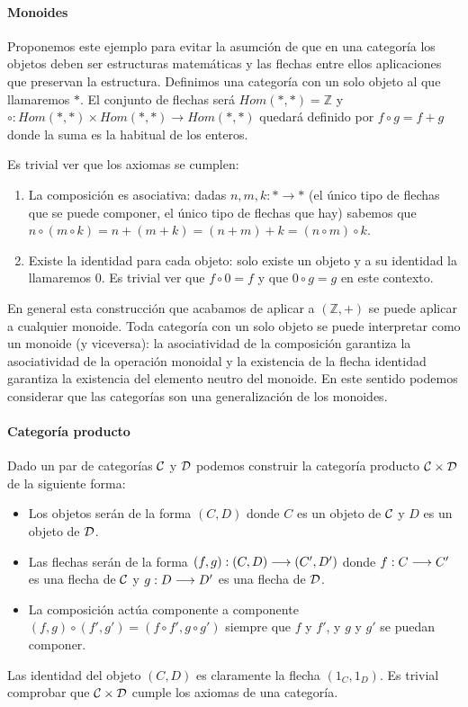 \paragraph{Monoides}
Proponemos este ejemplo para evitar la asumción de que en una categoría
los objetos deben ser estructuras matemáticas y las flechas entre ellos
aplicaciones que preservan la estructura. Definimos una categoría
con un solo objeto al que llamaremos $*$. El conjunto de flechas
será $Hom(*, *) = \mathbb{Z}$ y
$\circ : Hom(*, *)\times Hom(*, *)\rightarrow Hom(*, *)$ quedará definido
por $f \circ g = f + g$ donde la suma es la habitual de los enteros.

Es trivial ver que los axiomas se cumplen:
\begin{enumerate}
\item La composición es asociativa: dadas $n, m, k : * \longrightarrow *$
(el único tipo de flechas que se puede componer, el único tipo de
flechas que hay) sabemos que
$n \circ (m \circ k) = n + (m + k) = (n + m) + k = (n \circ m) \circ k$.

\item Existe la identidad para cada objeto: solo existe un objeto y a su
identidad la llamaremos 0. Es trivial ver que $f \circ 0 = f$ y que
$0 \circ g = g$ en este contexto.
\end{enumerate}
En general esta construcción que acabamos de aplicar a $(\mathbb{Z}, +)$
se puede aplicar a cualquier monoide. Toda categoría con un solo
objeto se puede interpretar como un monoide (y viceversa):
la asociatividad de la
composición garantiza la asociatividad de la operación monoidal y
la existencia de la flecha identidad garantiza la existencia del
elemento neutro del monoide. En este sentido podemos considerar que
las categorías son una generalización de los monoides.

\paragraph{Categoría producto}
Dado un par de categorías $\mathcal{C}$ y $\mathcal{D}$ podemos construir la categoría
producto $\mathcal{C}\times\mathcal{D}$ de la siguiente forma:
\begin{itemize}
\item Los objetos serán de la forma $(C, D)$ donde $C$ es un objeto
  de $\mathcal{C}$ y $D$ es un objeto de $\mathcal{D}$.
\item Las flechas serán de la forma $(f, g) : (C, D)\longrightarrow (C', D')$
  donde $f: C\longrightarrow C'$ es una flecha de $\mathcal{C}$ y $g : D\longrightarrow D'$
  es una flecha de $\mathcal{D}$.
\item La composición actúa componente a componente
  $(f, g) \circ (f', g') = (f \circ f', g \circ g')$ siempre
  que $f$ y $f'$, y $g$ y $g'$ se puedan componer.
\end{itemize}

Las identidad del objeto $(C, D)$ es claramente la flecha
$(1_C, 1_D)$. Es trivial comprobar que $\mathcal{C}\times\mathcal{D}$ cumple
los axiomas de una categoría.
